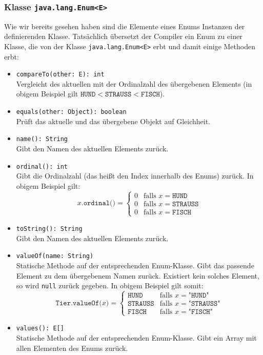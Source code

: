 	\subsubsection{Klasse \texttt{java.lang.Enum<E>}}
		Wie wir bereits gesehen haben sind die Elemente eines Enums Instanzen der definierenden Klasse. Tatsächlich übersetzt der Compiler ein Enum zu einer Klasse, die von der Klasse \lstinline|java.lang.Enum<E>| erbt und damit einige Methoden erbt:
		\begin{itemize}
			\item \lstinline|compareTo(other: E): int| \\ Vergleicht des aktuellen mit der Ordinalzahl des übergebenen Elements (in obigem Beispiel gilt \( \texttt{HUND} < \texttt{STRAUSS} < \texttt{FISCH} \)).
			\item \lstinline|equals(other: Object): boolean| \\ Prüft das aktuelle und das übergebene Objekt auf Gleichheit.
			\item \lstinline|name(): String| \\ Gibt den Namen des aktuellen Elements zurück.
			\item \lstinline|ordinal(): int| \\ Gibt die Ordinalzahl (das heißt den Index innerhalb des Enums) zurück. In obigem Beispiel gilt:
				\begin{equation}
					x.\texttt{ordinal()} =
						\begin{cases*}
							0 & \text{falls } x = \texttt{HUND}    \\
							0 & \text{falls } x = \texttt{STRAUSS} \\
							0 & \text{falls } x = \texttt{FISCH}
						\end{cases*}
				\end{equation}
			\item \lstinline|toString(): String| \\ Gibt den Namen des aktuellen Elements zurück.
			\item \lstinline|valueOf(name: String)| \\ Statische Methode auf der entsprechenden Enum-Klasse. Gibt das passende Element zu dem übergebenem Namen zurück. Existiert kein solches Element, so wird \lstinline|null| zurück gegeben. In obigem Beispiel gilt somit:
				\begin{equation}
					\texttt{Tier.valueOf(}x\texttt{)} =
						\begin{cases*}
							\texttt{HUND}    & \text{falls } x = \texttt{"HUND"}    \\
							\texttt{STRAUSS} & \text{falls } x = \texttt{"{}STRAUSS"} \\
							\texttt{FISCH}   & \text{falls } x = \texttt{"FISCH"}
						\end{cases*}
				\end{equation}
			\item \lstinline|values(): E[]| \\ Statische Methode auf der entsprechenden Enum-Klasse. Gibt ein Array mit allen Elementen des Enums zurück.
		\end{itemize}
	
